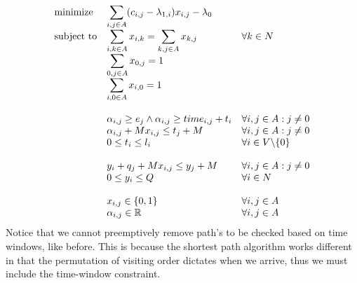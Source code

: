 \documentclass{article}
\begin{document}
    \begin{equation*}
        \begin{array}{ll@{}ll}
            \text{minimize}  & \displaystyle\sum_{i,j \in A} ( c_{i, j} - \lambda_{1,i})x_{i,j} - \lambda_0&&\\
            \text{subject to}& \displaystyle\sum_{i, k \in A}x_{i,k} = \sum_{k, j \in A}x_{k,j} &&\forall k \in N\\
            & \displaystyle\sum_{0,j \in A}x_{0,j} = 1 &&\\
            & \displaystyle\sum_{i,0 \in A}x_{i,0} = 1 &&\\\\
            & \displaystyle\alpha_{i,j} \geq e_j \land \alpha_{i,j} \geq time_{i,j} + t_i &&  \forall i,j \in A: j \neq 0\\
            & \displaystyle \alpha_{i,j} + Mx_{i,j} \leq t_j + M  && \forall i,j \in A: j \neq 0\\
            & \displaystyle0 \leq t_i \leq l_i &&  \forall i \in V \backslash \{ 0 \}\\\\
            & \displaystyle y_i + q_j + M x_{i,j} \leq y_j + M & & \forall i,j \in A : j \neq 0\\
            & \displaystyle 0 \leq y_i \leq Q && \forall i \in N \\\\
            & \displaystyle x_{i,j} \in \{0,1\} && \forall i,j \in A\\
            & \displaystyle \alpha_{i,j} \in \mathbb{R} && \forall i,j \in A
        \end{array}
    \end{equation*}
    Notice that we cannot preemptively remove path's to be checked based on time windows, like before.
    This is because the shortest path algorithm works different in that the permutation of visiting order dictates when we arrive, thus we must include the time-window constraint.

    \clearpage
\end{document}
